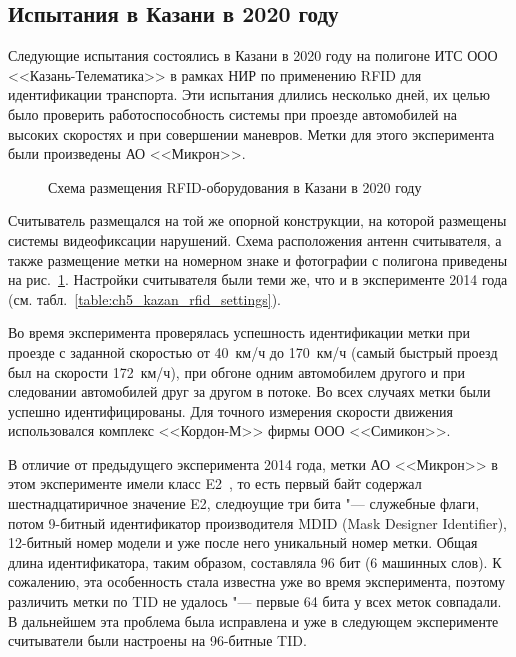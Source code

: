 \subsection{Испытания в Казани в 2020 году}\label{sec:ch5_experiments_kazan2020}

Следующие испытания состоялись в Казани в 2020 году на полигоне ИТС ООО <<Казань-Телематика>> в рамках НИР по применению RFID для идентификации транспорта. Эти испытания длились несколько дней, их целью было проверить работоспособность системы при проезде автомобилей на высоких скоростях и при совершении маневров. Метки для этого эксперимента были произведены АО <<Микрон>>.


\begin{figure}[ht]
  \caption{Схема размещения RFID-оборудования в Казани в 2020 году}
  \label{fig:ch5_kazan2020_schema}
\end{figure}

Считыватель размещался на той же опорной конструкции, на которой размещены системы видеофиксации нарушений. Схема расположения антенн считывателя, а также размещение метки на номерном знаке и фотографии с полигона приведены на рис.~\ref{fig:ch5_kazan2020_schema}. Настройки считывателя были теми же, что и в эксперименте 2014 года (см. табл.~\ref{table:ch5_kazan_rfid_settings}).

Во время эксперимента проверялась успешность идентификации метки при проезде с заданной скоростью от 40~км/ч до 170~км/ч (самый быстрый проезд был на скорости 172~км/ч), при обгоне одним автомобилем другого и при следовании автомобилей друг за другом в потоке. Во всех случаях метки были успешно идентифицированы. Для точного измерения скорости движения использовался комплекс <<Кордон-М>> фирмы ООО <<Симикон>>.

В отличие от предыдущего эксперимента 2014 года, метки АО <<Микрон>> в этом эксперименте имели класс E2~\cite{StdGen2}, то есть первый байт содержал шестнадцатиричное значение E2, следюущие три бита "--- служебные флаги, потом 9-битный идентификатор производителя MDID (Mask Designer Identifier), 12-битный номер модели и уже после него уникальный номер метки. Общая длина идентификатора, таким образом, составляла 96 бит (6 машинных слов). К сожалению, эта особенность стала известна уже во время эксперимента, поэтому различить метки по TID не удалось "--- первые 64 бита у всех меток совпадали. В дальнейшем эта проблема была исправлена и уже в следующем эксперименте считыватели были настроены на 96-битные TID.

